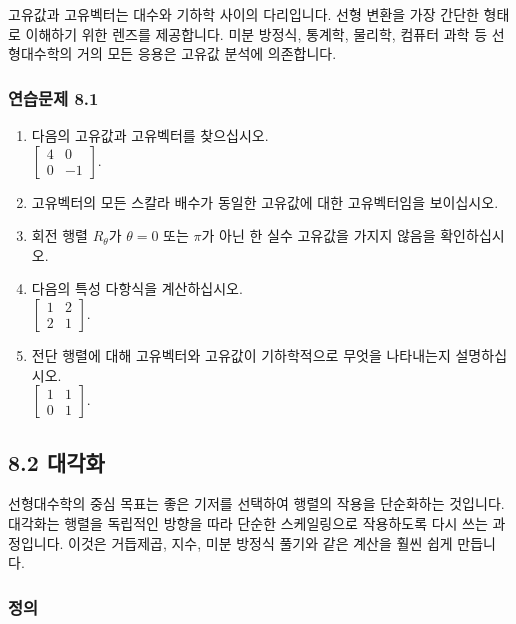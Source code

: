 \documentclass[
  12pt,
  a4paper,
]{article}
\begin{document}
고유값과 고유벡터는 대수와 기하학 사이의 다리입니다. 선형 변환을 가장 간단한 형태로 이해하기 위한 렌즈를 제공합니다. 미분 방정식, 통계학, 물리학, 컴퓨터 과학 등 선형대수학의 거의 모든 응용은 고유값 분석에 의존합니다.

\subsubsection{연습문제 8.1}\label{exercises-81}

\begin{enumerate}
\def\labelenumi{\arabic{enumi}.}
\item
  다음의 고유값과 고유벡터를 찾으십시오.\\
  \(\begin{bmatrix} 4 & 0 \\ 0 & -1 \end{bmatrix}\).
\item
  고유벡터의 모든 스칼라 배수가 동일한 고유값에 대한 고유벡터임을 보이십시오.
\item
  회전 행렬 \(R_\theta\)가 \(\theta = 0\) 또는 \(\pi\)가 아닌 한 실수 고유값을 가지지 않음을 확인하십시오.
\item
  다음의 특성 다항식을 계산하십시오.\\
  \(\begin{bmatrix} 1 & 2 \\ 2 & 1 \end{bmatrix}\).
\item
  전단 행렬에 대해 고유벡터와 고유값이 기하학적으로 무엇을 나타내는지 설명하십시오.\\
  \(\begin{bmatrix} 1 & 1 \\ 0 & 1 \end{bmatrix}\).
\end{enumerate}

\subsection{8.2 대각화}\label{82-diagonalization}

선형대수학의 중심 목표는 좋은 기저를 선택하여 행렬의 작용을 단순화하는 것입니다. 대각화는 행렬을 독립적인 방향을 따라 단순한 스케일링으로 작용하도록 다시 쓰는 과정입니다. 이것은 거듭제곱, 지수, 미분 방정식 풀기와 같은 계산을 훨씬 쉽게 만듭니다.

\subsubsection{정의}\label{definition-6}
\end{document}

